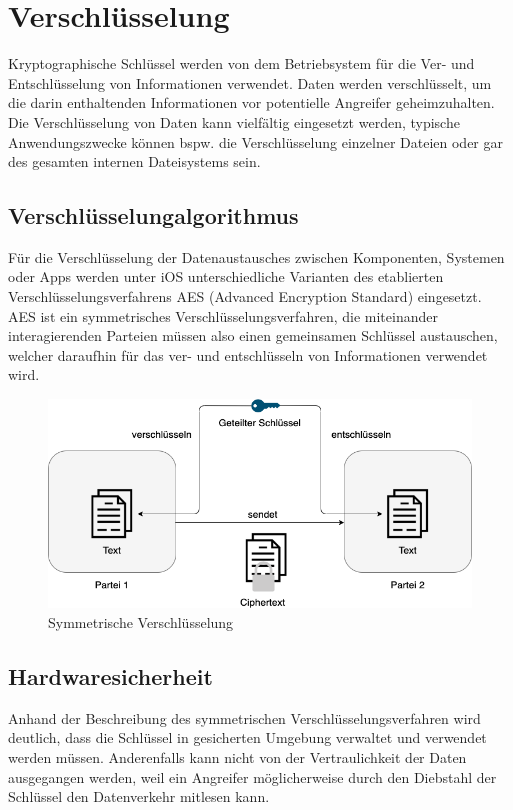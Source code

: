\section{Verschlüsselung}
Kryptographische Schlüssel werden von dem Betriebsystem für die Ver- und Entschlüsselung von 
Informationen verwendet. Daten werden verschlüsselt, um die darin enthaltenden Informationen 
vor potentielle Angreifer geheimzuhalten. Die Verschlüsselung von Daten kann vielfältig eingesetzt werden, 
typische Anwendungszwecke können bspw. die Verschlüsselung einzelner Dateien oder gar des gesamten internen Dateisystems sein.


\subsection{Verschlüsselungalgorithmus}
Für die Verschlüsselung der Datenaustausches zwischen Komponenten, Systemen oder Apps
werden unter iOS unterschiedliche Varianten des etablierten Verschlüsselungsverfahrens
AES (Advanced Encryption Standard) eingesetzt. AES ist ein symmetrisches Verschlüsselungsverfahren,
die miteinander interagierenden Parteien müssen also einen gemeinsamen Schlüssel austauschen, welcher
daraufhin für das ver- und entschlüsseln von Informationen verwendet wird. \\

	\begin{figure}[h]
		\centering
		\includegraphics[width=135mm]{images/symmetric.png}
		\caption{Symmetrische Verschlüsselung}
		\label{fig:symmetric}
	\end{figure}

\pagebreak

\subsection{Hardwaresicherheit}
Anhand der Beschreibung des symmetrischen Verschlüsselungsverfahren wird deutlich, dass die Schlüssel in
gesicherten Umgebung verwaltet und verwendet werden müssen. Anderenfalls kann nicht von der Vertraulichkeit 
der Daten ausgegangen werden, weil ein Angreifer möglicherweise durch den Diebstahl der Schlüssel den Datenverkehr
mitlesen kann. \\

